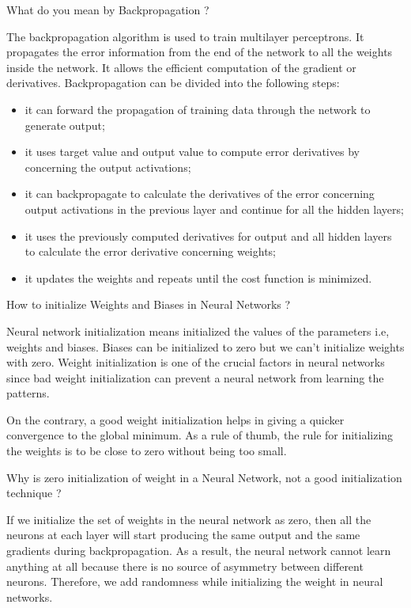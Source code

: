 \documentclass[12pt,a4paper]{exam}
\begin{document}
\question
What do you mean by Backpropagation ?
\fillwithlines{3cm}
\begin{solution}
The backpropagation algorithm is used to train multilayer perceptrons. It propagates the error information from the end of the network to all the weights inside the network. It allows the efficient computation of the gradient or derivatives.
Backpropagation can be divided into the following steps:
\begin{itemize}
\item it can forward the propagation of training data through the network to generate output;
\item it uses target value and output value to compute error derivatives by concerning the output activations;
\item it can backpropagate to calculate the derivatives of the error concerning output activations in the previous layer and continue for all the hidden layers;
\item it uses the previously computed derivatives for output and all hidden layers to calculate the error derivative concerning weights;
\item it updates the weights and repeats until the cost function is minimized.
\end{itemize}
\end{solution}


\question
How to initialize Weights and Biases in Neural Networks ?
\fillwithlines{3cm}
\begin{solution}
Neural network initialization means initialized the values of the parameters i.e, weights and biases. Biases can be initialized to zero but we can’t initialize weights with zero.
Weight initialization is one of the crucial factors in neural networks since bad weight initialization can prevent a neural network from learning the patterns.

On the contrary, a good weight initialization helps in giving a quicker convergence to the global minimum. As a rule of thumb, the rule for initializing the weights is to be close to zero without being too small.
\end{solution}


\question
Why is zero initialization of weight in a Neural Network, not a good initialization technique ?
\fillwithlines{3cm}
\begin{solution}
If we initialize the set of weights in the neural network as zero, then all the neurons at each layer will start producing the same output and the same gradients during backpropagation.
As a result, the neural network cannot learn anything at all because there is no source of asymmetry between different neurons. Therefore, we add randomness while initializing the weight in neural networks.
\end{solution}
\end{document}
